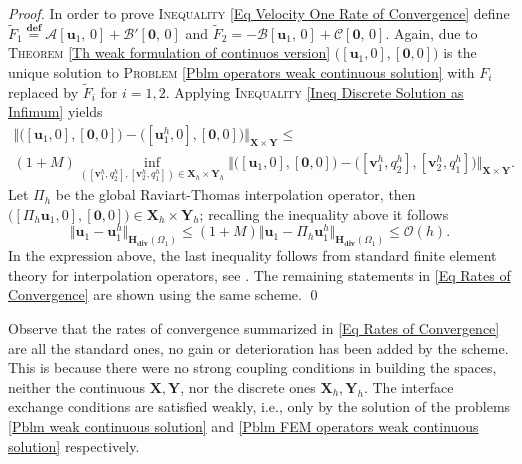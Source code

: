\documentclass[3p]{elsarticle}
\def\A{{\mathcal A}}
\def\B{{\mathcal B}}
\def\C{{\mathcal C}}
\def\X{\mathbf X}
\def\Y{\mathbf Y}
\def\uone{\mathbf{u}_{1}}
\def\uoneh{\mathbf{u}_{1}^{h}}
\def\Hdiv{\mathbf{H_{div}}}
\def\voneh{\mathbf{v}_{1}^{h}}
\def\vtwoh{\mathbf{v}_{2}^{h}}
\def\qoneh{q_{1}^{h}}
\def\qtwoh{q_{2}^{h}}
\def\defining{\overset{\mathbf{def}} =}
\begin{document}
\begin{proof}
In order to prove \textsc{Inequality} \eqref{Eq Velocity One Rate of Convergence} define $ \widetilde{F}_{1} \defining  \A[ \uone,\,0] + \B ' [ \boldsymbol{0},\, 0] $ and $ \widetilde{F}_{2} = - \B [\uone,\,0]  + \C [\boldsymbol{0},\,0] $. Again, due to \textsc{Theorem} \ref{Th weak formulation of continuos version} $ \big( [\uone, 0], [\boldsymbol{0}, 0]\big) $ is the unique solution to \textsc{Problem} \ref{Pblm operators weak continuous solution} with $ F_{i} $ replaced by $ \widetilde{F}_{i} $ for $ i = 1, 2 $. Applying \textsc{Inequality} \eqref{Ineq Discrete Solution as Infimum} yields
%
\begin{multline*} %
\big\Vert \big( [\uone, 0], [\boldsymbol{0}, 0]\big) 
- \big( [\uoneh, 0], [\boldsymbol{0}, 0]\big)\big\Vert_{\X\times \Y} \leq 
\\
(1 + M ) \inf\limits_{ ( [\voneh, \qtwoh], [\vtwoh, \qoneh] )\in \X_{h} \times \Y_{h}}
\big\Vert 
\big( [\uone, 0], [\boldsymbol{0}, 0]\big)
- \big( [\voneh, \qtwoh], [\vtwoh, \qoneh]\big)
\big\Vert_{\X\times \Y} .
\end{multline*}
%
Let $ \Pi_{h} $ be the global Raviart-Thomas interpolation operator, then $ \big( [\Pi_{h}\uone, 0], [\boldsymbol{0}, 0]\big) \in \X_{h}\times \Y_{h} $; recalling the inequality above it follows
%
\begin{equation*} %
\big\Vert \uone - \uoneh \big\Vert_{ \Hdiv(\Omega_{1}) } \leq 
(1 + M ) \big\Vert \uone - \Pi_{h}\uoneh \big\Vert_{ \Hdiv(\Omega_{1}) } 
\leq \mathcal{O}(h) .
\end{equation*}
% 
In the expression above, the last inequality follows from standard finite element theory for interpolation operators, see \cite{GaticaMixed}. The remaining statements in \eqref{Eq Rates of Convergence} are shown using the same scheme.
%
\qed
\end{proof}
%
%
%
\begin{remark}
Observe that the rates of convergence summarized in \eqref{Eq Rates of Convergence} are all the standard ones, no gain or deterioration has been added by the scheme. This is because there were no strong coupling conditions in building the spaces, neither the continuous $ \X, \Y $, nor the discrete ones $ \X_{h}, \Y_{h} $. The interface exchange conditions are satisfied weakly, i.e., only by the solution of the problems \eqref{Pblm weak continuous solution} and \eqref{Pblm FEM operators weak continuous solution} respectively.
\end{remark}
%
%
%
%
%
%
%
%
%
\end{document}
